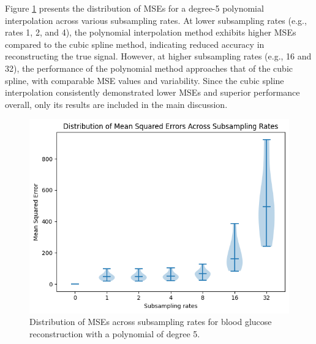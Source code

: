 Figure \ref{fig:mses_poly5} presents the distribution of MSEs for a degree-5 polynomial interpolation across various subsampling rates. At lower subsampling rates (e.g., rates 1, 2, and 4), the polynomial interpolation method exhibits higher MSEs compared to the cubic spline method, indicating reduced accuracy in reconstructing the true signal. However, at higher subsampling rates (e.g., 16 and 32), the performance of the polynomial method approaches that of the cubic spline, with comparable MSE values and variability. Since the cubic spline interpolation consistently demonstrated lower MSEs and superior performance overall, only its results are included in the main discussion.
\begin{figure}[h] %
	\centering
	\includegraphics[width=\linewidth]{Figures/distribution_mses_poly5.png} %
	\caption{Distribution of MSEs across subsampling rates for blood glucose reconstruction with a polynomial of degree 5.}
	\label{fig:mses_poly5}  %
\end{figure}

